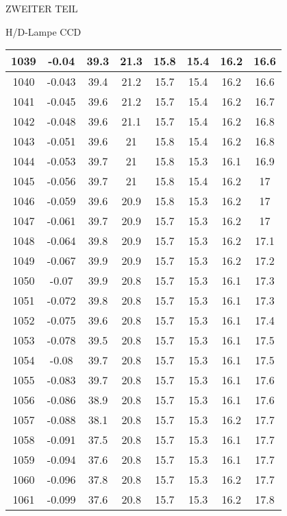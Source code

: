 \begin{appendix}
\begin{chapter}{ZWEITER TEIL}
\begin{section}{H/D-Lampe CCD}
\begin{scriptsize}
\begin{longtable}[htbp]{|c|c|c|c|c|c|c|c|}
            1039 & -0.04 & 39.3 & 21.3 & 15.8 & 15.4 & 16.2 & 16.6 \\ \hline
            1040 & -0.043 & 39.4 & 21.2 & 15.7 & 15.4 & 16.2 & 16.6 \\ \hline
            1041 & -0.045 & 39.6 & 21.2 & 15.7 & 15.4 & 16.2 & 16.7 \\ \hline
            1042 & -0.048 & 39.6 & 21.1 & 15.7 & 15.4 & 16.2 & 16.8 \\ \hline
            1043 & -0.051 & 39.6 & 21 & 15.8 & 15.4 & 16.2 & 16.8 \\ \hline
            1044 & -0.053 & 39.7 & 21 & 15.8 & 15.3 & 16.1 & 16.9 \\ \hline
            1045 & -0.056 & 39.7 & 21 & 15.8 & 15.4 & 16.2 & 17 \\ \hline
            1046 & -0.059 & 39.6 & 20.9 & 15.8 & 15.3 & 16.2 & 17 \\ \hline
            1047 & -0.061 & 39.7 & 20.9 & 15.7 & 15.3 & 16.2 & 17 \\ \hline
            1048 & -0.064 & 39.8 & 20.9 & 15.7 & 15.3 & 16.2 & 17.1 \\ \hline
            1049 & -0.067 & 39.9 & 20.9 & 15.7 & 15.3 & 16.2 & 17.2 \\ \hline
            1050 & -0.07 & 39.9 & 20.8 & 15.7 & 15.3 & 16.1 & 17.3 \\ \hline
            1051 & -0.072 & 39.8 & 20.8 & 15.7 & 15.3 & 16.1 & 17.3 \\ \hline
            1052 & -0.075 & 39.6 & 20.8 & 15.7 & 15.3 & 16.1 & 17.4 \\ \hline
            1053 & -0.078 & 39.5 & 20.8 & 15.7 & 15.3 & 16.1 & 17.5 \\ \hline
            1054 & -0.08 & 39.7 & 20.8 & 15.7 & 15.3 & 16.1 & 17.5 \\ \hline
            1055 & -0.083 & 39.7 & 20.8 & 15.7 & 15.3 & 16.1 & 17.6 \\ \hline
            1056 & -0.086 & 38.9 & 20.8 & 15.7 & 15.3 & 16.1 & 17.6 \\ \hline
            1057 & -0.088 & 38.1 & 20.8 & 15.7 & 15.3 & 16.2 & 17.7 \\ \hline
            1058 & -0.091 & 37.5 & 20.8 & 15.7 & 15.3 & 16.1 & 17.7 \\ \hline
            1059 & -0.094 & 37.6 & 20.8 & 15.7 & 15.3 & 16.1 & 17.7 \\ \hline
            1060 & -0.096 & 37.8 & 20.8 & 15.7 & 15.3 & 16.2 & 17.7 \\ \hline
            1061 & -0.099 & 37.6 & 20.8 & 15.7 & 15.3 & 16.2 & 17.8 \\ \hline

\end{longtable}
\end{scriptsize}
\end{section}
\end{chapter}
\end{appendix}

